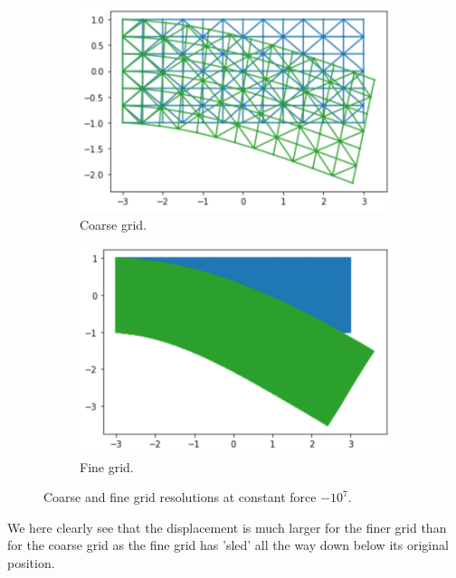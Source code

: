  \begin{figure}[H]
	\centering
	\begin{subfigure}[b]{0.49\linewidth}
		\centering
		\includegraphics[width=\linewidth]{Materials/Steelviz}
		\caption{Coarse grid.}
	\end{subfigure}
	\hfill
	\begin{subfigure}[b]{0.49\linewidth}
		\centering
		\includegraphics[width=\linewidth]{Materials/Fine}
		\caption{Fine grid.}
	\end{subfigure}
	\caption{Coarse and fine grid resolutions at constant force $-10^7$.}
	\label{show}
\end{figure}
We here clearly see that the displacement is much larger for the finer grid than for the coarse grid as the fine grid has 'sled' all the way down below its original position.


